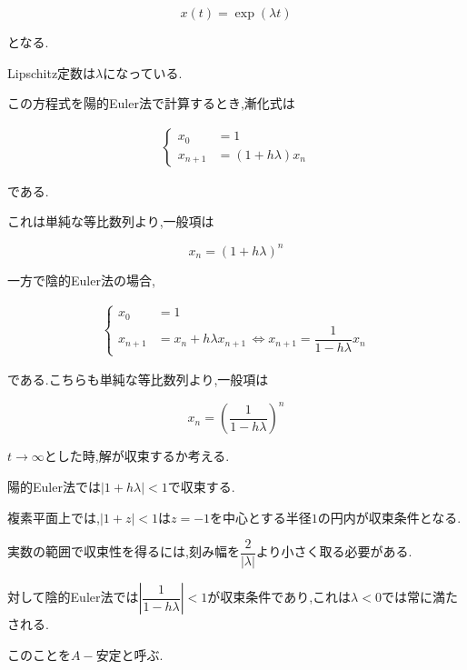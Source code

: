 $$x(t)=\exp(\lambda t)$$

となる.

Lipschitz定数は$\lambda$になっている.



この方程式を陽的Euler法で計算するとき,漸化式は

\begin{align}

\begin{cases}

x_0&=1\\

x_{n+1}&=(1+h\lambda)x_n

\end{cases}

\end{align}

である.

これは単純な等比数列より,一般項は

$$x_n=(1+h\lambda)^n$$



一方で陰的Euler法の場合,

\begin{align}

\begin{cases}

x_0&=1\\

x_{n+1}&=x_n+h\lambda x_{n+1}\,\iff x_{n+1}=\dfrac{1}{1-h\lambda}x_n

\end{cases}

\end{align}

である.こちらも単純な等比数列より,一般項は

$$x_n=\left(\dfrac{1}{1-h\lambda}\right)^n$$





$t\to\infty$とした時,解が収束するか考える.

陽的Euler法では$|1+h\lambda|<1$で収束する.

複素平面上では,$|1+z|<1$は$z=-1$を中心とする半径$1$の円内が収束条件となる.

実数の範囲で収束性を得るには,刻み幅を$\dfrac{2}{|\lambda|} $より小さく取る必要がある.

対して陰的Euler法では$\left|\dfrac{1}{1-h\lambda}\right|<1$が収束条件であり,これは$\lambda<0$では常に満たされる.

このことを$A-$安定と呼ぶ.



